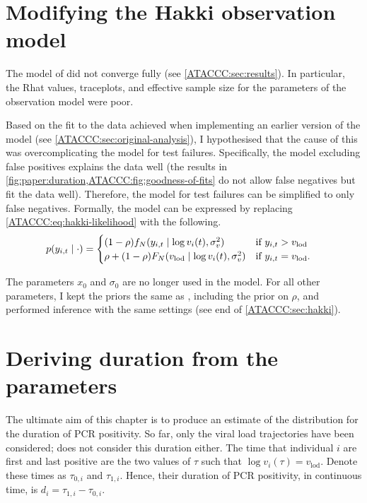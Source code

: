 \documentclass[thesis.tex]{subfiles}
\begin{document}
\section{Modifying the Hakki observation model} \label{ATACCC:sec:observation-modification}

The model of \textcite{hakkiOnset} did not converge fully (see \cref{ATACCC:sec:results}).
In particular, the Rhat values, traceplots, and effective sample size for the parameters of the observation model were poor.

Based on the fit to the data achieved when implementing an earlier version of the model (see \cref{ATACCC:sec:original-analysis}), I hypothesised that the cause of this was overcomplicating the model for test failures.
Specifically, the model excluding false positives explains the data well (the results in \cref{fig:paper:duration,ATACCC:fig:goodness-of-fits} do not allow false negatives but fit the data well).
Therefore, the model for test failures can be simplified to only false negatives.
Formally, the model can be expressed by replacing \cref{ATACCC:eq:hakki-likelihood} with the following.
\begin{align}
p(y_{i,t} \mid \cdot) &= \begin{cases}
    (1 - \rho) f_N(y_{i,t} \mid \log v_i(t), \sigma_v^2) & \text{if $y_{i,t} > v_\text{lod}$}\\
    \rho + (1 - \rho) F_N(v_\text{lod} \mid \log v_i(t), \sigma_v^2) & \text{if $y_{i,t} = v_\text{lod}$.}
\end{cases}
\end{align}

The parameters $x_0$ and $\sigma_0$ are no longer used in the model.
For all other parameters, I kept the priors the same as \textcite{hakkiOnset}, including the prior on $\rho$, and performed inference with the same settings (see end of \cref{ATACCC:sec:hakki}).


\section{Deriving duration from the parameters} \label{ATACCC:sec:duration}

The ultimate aim of this chapter is to produce an estimate of the distribution for the duration of PCR positivity.
So far, only the viral load trajectories have been considered; \textcite{hakkiOnset} does not consider this duration either.
The time that individual $i$ are first and last positive are the two values of $\tau$ such that $\log v_i(\tau) = v_\text{lod}$.
Denote these times as $\tau_{0,i}$ and $\tau_{1,i}$.
Hence, their duration of PCR positivity, in continuous time, is $d_i = \tau_{1,i} - \tau_{0,i}$.
\end{document}

